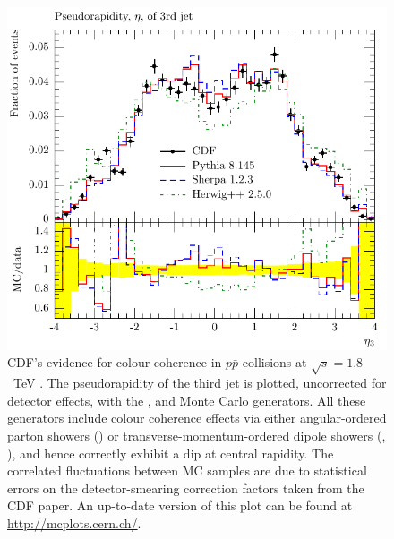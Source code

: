 \begin{figure}[tp]
  \centering
  \includegraphics[scale=0.7]{mc-plots/CDF_1994_S2952106-cmp/CDF_1994_S2952106_d03-x01-y01}
  \caption{CDF's evidence for colour coherence in $p\bar{p}$ collisions at
    $\sqrt{s} = 1.8$~TeV \cite{Abe:1994nj}. The pseudorapidity of the
    third jet is plotted, uncorrected for detector effects, with the
    \herwigpp, \pythiaeight and \sherpa Monte Carlo generators. All
    these generators include colour coherence effects via either angular-ordered
    parton showers (\herwigpp) or transverse-momentum-ordered dipole showers
    (\pythiaeight, \sherpa),  and hence correctly exhibit a dip at central
    rapidity. The correlated fluctuations between MC samples are due to
    statistical errors on the detector-smearing correction factors taken
    from the CDF paper. An up-to-date version of this plot can be found
    at \url{http://mcplots.cern.ch/}.}
  \label{fig:cmp:cdf-colour-coherence}
\end{figure}


